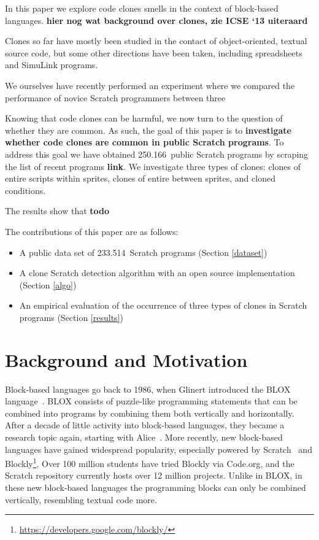 \documentclass[times,10pt,twocolumn]{article}
\newcommand{\nPrograms}{250.166}
\newcommand{\nScriptPrograms}{233.514}
\newcommand{\todo}[1]{\textbf{#1}}
\begin{document}
In this paper we explore code clones smells in the context of block-based languages. \todo{hier nog wat background over clones, zie ICSE `13 uiteraard}

Clones so far have mostly been studied in the contact of object-oriented, textual source code, but some other directions have been taken, including spreadsheets and SimuLink programs. 

 
We ourselves have recently performed an experiment where we compared the performance of novice Scratch programmers between three 

Knowing that code clones can be harmful, we now turn to the question of whether they are common. As such, the goal of this paper is to \textbf{investigate whether code clones are common in public Scratch programs}.  To address this goal we have obtained \nPrograms~public Scratch programs by scraping the list of recent programs \todo{link}. We investigate three types of clones: clones of entire scripts within sprites, clones of entire between sprites, and cloned conditions.

The results show that \todo{todo}

The contributions of this paper are as follows:

\begin{itemize}
\item{A public data set of \nScriptPrograms~Scratch programs (Section \ref{dataset})}
\item{A clone Scratch detection algorithm with an open source implementation (Section \ref{algo})}
\item{An empirical evaluation of the occurrence of three types of clones in Scratch programs (Section \ref{results})}
\end{itemize}

\section{Background and Motivation}
\label{sec:background}
Block-based languages go back to 1986, when Glinert introduced the BLOX language~\cite{e._glinert_towards_1986}. BLOX consists of puzzle-like programming statements that can be combined into programs by combining them both vertically and horizontally. After a decade of little activity into block-based languages, they became a research topic again, starting with Alice~\cite{conway_alice:_1994}. More recently, new block-based languages have gained widespread popularity, especially powered by Scratch~\cite{resnick_scratch:_2009} and Blockly\footnote{\url{https://developers.google.com/blockly/}}. Over 100 million students have tried Blockly via Code.org, and the Scratch repository currently hosts over 12 million projects. Unlike in BLOX, in these new block-based languages the programming blocks can only be combined vertically, resembling textual code more.
\end{document}
